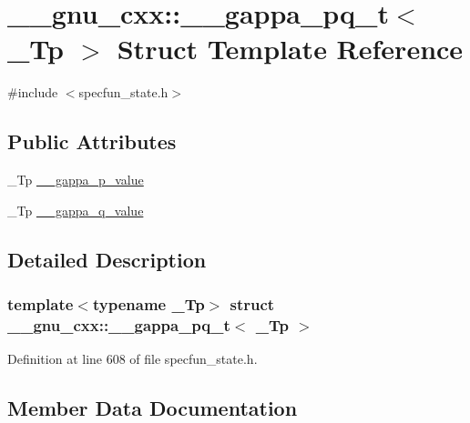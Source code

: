 \hypertarget{struct____gnu__cxx_1_1____gappa__pq__t}{}\section{\+\_\+\+\_\+gnu\+\_\+cxx\+:\+:\+\_\+\+\_\+gappa\+\_\+pq\+\_\+t$<$ \+\_\+\+Tp $>$ Struct Template Reference}
\label{struct____gnu__cxx_1_1____gappa__pq__t}


{\ttfamily \#include $<$specfun\+\_\+state.\+h$>$}

\subsection*{Public Attributes}
\begin{DoxyCompactItemize}
\item 
\+\_\+\+Tp \hyperlink{struct____gnu__cxx_1_1____gappa__pq__t_a73fcc1e1029dd11fad960b142b98f3cf}{\+\_\+\+\_\+gappa\+\_\+p\+\_\+value}
\item 
\+\_\+\+Tp \hyperlink{struct____gnu__cxx_1_1____gappa__pq__t_afd7d83a4e618ca4b710c952638951714}{\+\_\+\+\_\+gappa\+\_\+q\+\_\+value}
\end{DoxyCompactItemize}


\subsection{Detailed Description}
\subsubsection*{template$<$typename \+\_\+\+Tp$>$\newline
struct \+\_\+\+\_\+gnu\+\_\+cxx\+::\+\_\+\+\_\+gappa\+\_\+pq\+\_\+t$<$ \+\_\+\+Tp $>$}



Definition at line 608 of file specfun\+\_\+state.\+h.



\subsection{Member Data Documentation}
\mbox{\label{struct____gnu__cxx_1_1____gappa__pq__t_a73fcc1e1029dd11fad960b142b98f3cf}} 
